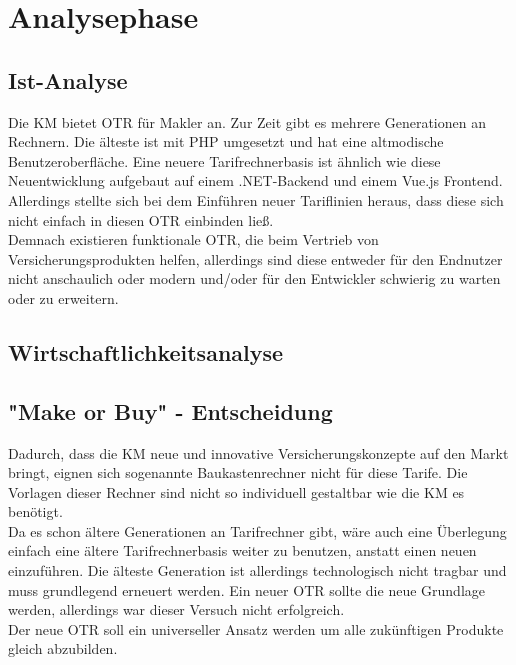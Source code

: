 \newpage
\section{Analysephase}
\label{analysephase}

\subsection{Ist-Analyse}
\label{ist}
\begin{comment}
evtl alte otrs mit nutzwertanalyse vergleichen?
\end{comment}
Die \ac{KM} bietet \ac{OTR} für Makler an. Zur Zeit gibt es mehrere Generationen an Rechnern. Die älteste ist mit PHP umgesetzt und hat eine altmodische Benutzeroberfläche. Eine neuere Tarifrechnerbasis ist ähnlich wie diese Neuentwicklung aufgebaut auf einem .NET-Backend und einem Vue.js Frontend. Allerdings stellte sich bei dem Einführen neuer Tariflinien heraus, dass diese sich nicht einfach in diesen \ac{OTR} einbinden ließ. \\
Demnach existieren funktionale \ac{OTR}, die beim Vertrieb von Versicherungsprodukten helfen, allerdings sind diese entweder für den Endnutzer nicht anschaulich oder modern und/oder für den Entwickler schwierig zu warten oder zu erweitern.

\subsection{Wirtschaftlichkeitsanalyse}
\label{wirtschaftlichkeitsanalyse}

\subsection{"Make or Buy" - Entscheidung}
\label{makeOrBuy}
Dadurch, dass die \ac{KM} neue und innovative Versicherungskonzepte auf den Markt bringt, eignen sich sogenannte Baukastenrechner nicht für diese Tarife. Die Vorlagen dieser Rechner sind nicht so individuell gestaltbar wie die \ac{KM} es benötigt.\\
Da es schon ältere Generationen an Tarifrechner gibt, wäre auch eine Überlegung einfach eine ältere Tarifrechnerbasis weiter zu benutzen, anstatt einen neuen einzuführen. Die älteste Generation ist allerdings technologisch nicht tragbar und muss grundlegend erneuert werden. Ein neuer \ac{OTR} sollte die neue Grundlage werden, allerdings war dieser Versuch nicht erfolgreich.\\
Der neue \ac{OTR} soll ein universeller Ansatz werden um alle zukünftigen Produkte gleich abzubilden.

